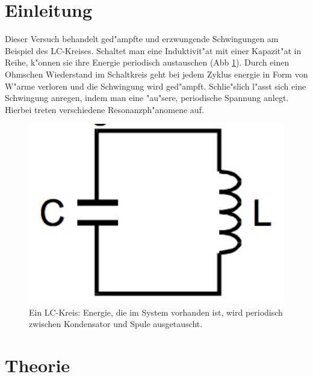 \section{Einleitung}
	\label{sec:einleitung}
	Dieser Versuch behandelt ged"ampfte und erzwungende Schwingungen am Beispiel des LC-Kreises.
	Schaltet man eine Induktivit"at mit einer Kapazit"at in Reihe, k"onnen sie ihre Energie periodisch austauschen (Abb \ref{fig:lc-kreis}).
	Durch einen Ohmschen Wiederstand im Schaltkreis geht bei jedem Zyklus energie in Form von W"arme verloren und die Schwingung wird ged"ampft.
	Schlie"slich l"asst sich eine Schwingung anregen, indem man eine "au"sere, periodische Spannung anlegt.
	Hierbei treten verschiedene Resonanzph"anomene auf.
	
	\begin{figure}[h!]
		\centering
		\includegraphics[width = 15cm]{img/lc-kreis.jpg}
		\caption{Ein LC-Kreis: Energie, die im System vorhanden ist, wird periodisch zwischen Kondensator und Spule ausgetauscht.}
		\label{fig:lc-kreis}
	\end{figure}

\section{Theorie}
	\label{sec:theorie}
